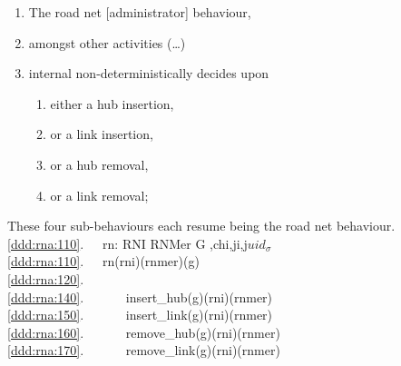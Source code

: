 {\begin{enumerate}\setei
\item \label{ddd:rna:110} The road net [administrator] behaviour,
\item \label{ddd:rna:120} amongst other activities (\ldots)
\item \label{ddd:rna:130} internal non-deterministically  decides upon 
\begin{enumerate}
\item \label{ddd:rna:140} either a hub insertion,
\item \label{ddd:rna:150} or a link insertion,
\item \label{ddd:rna:160} or a hub removal,
\item \label{ddd:rna:170} or a link removal;
\end{enumerate}         
\savei\end{enumerate}
\noindent
\begynd
\pind These four sub-behaviours each resume being the road net behaviour.
\afslut
\mnewfoil
\pos{}{\vspace*{-10mm}}
\bp
{}\\
\ref{ddd:rna:110}.\ \ \ rn: RNI {\RIGHTARROW} RNMer {\RIGHTARROW} G {\RIGHTARROW} ,ch{\LBRACKET}{\LBRACE}i,j{\RBRACE}{\RBRACKET}{\BAR}{\LBRACE}i,j{\RBRACE}{\SUBSETEQ}${uid}_{\sigma}${\RBRACE}\\
\ref{ddd:rna:110}.\ \ \ rn(rni)(rnmer)(g) {\IS}\\
\ref{ddd:rna:120}.\ \ \ \ \ \ \ \ {\DOTDOTDOT}\\
\ref{ddd:rna:140}.\ \ \ \ \ \ {\NONDETCHOICE} insert\_hub(g)(rni)(rnmer)\\
\ref{ddd:rna:150}.\ \ \ \ \ \ {\NONDETCHOICE} insert\_link(g)(rni)(rnmer)\ \ \ \ \ \ \ \ \\
\ref{ddd:rna:160}.\ \ \ \ \ \ {\NONDETCHOICE} remove\_hub(g)(rni)(rnmer)\\
\ref{ddd:rna:170}.\ \ \ \ \ \ {\NONDETCHOICE} remove\_link(g)(rni)(rnmer)
\ep
                                                    

}
